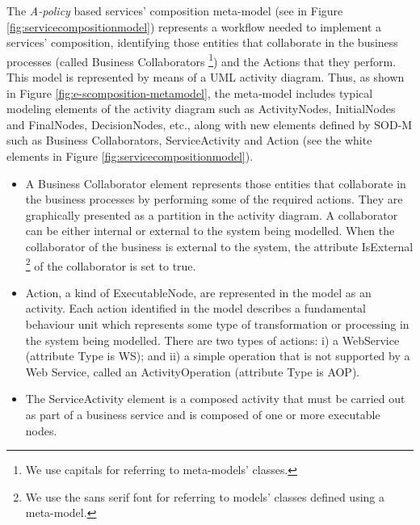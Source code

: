 
The {\em A-policy} based services' composition meta-model (see  in Figure \ref{fig:servicecompositionmodel})
represents  a workflow needed to implement a services' composition, identifying those entities that collaborate in the business processes (called {\sc Business Collaborators} \footnote{We use {\sc capitals} for referring to meta-models' classes.}) and the {\sc Actions} that  they perform. This model is represented by means of a UML activity diagram. Thus, as shown in Figure \ref{fig:e-scomposition-metamodel}, the meta-model includes typical modeling elements of the activity diagram such as {\sc ActivityNodes}, {\sc InitialNodes} and {\sc FinalNodes}, {\sc DecisionNodes}, etc., along with new elements defined by SOD-M such as {\sc Business Collaborators}, {\sc ServiceActivity} and {\sc Action} (see the white  elements   in Figure \ref{fig:servicecompositionmodel}).

\begin{itemize}
\item A {\sc Business Collaborator} element represents those entities that collaborate in the business processes by performing some of the required actions. They are graphically presented as a partition in the activity diagram. A collaborator can be either internal or external to the system being modelled. When the collaborator of the business is external to the system, the attribute {\sf\small IsExternal} \footnote{We use the {\sf sans serif} font for referring to models' classes defined using a meta-model.} of the collaborator is set to true.

\item {\sc Action}, a kind of {\sc ExecutableNode}, are represented in the model as an activity. Each action identified in the model describes a fundamental behaviour unit which represents some type of transformation or processing in the system being modelled. There are two types of actions: i) a WebService (attribute Type is {\sf\small WS}); and ii) a simple operation that is not supported by a Web Service, called an {\sc ActivityOperation} (attribute Type is {\sc AOP}).
    
\item The {\sc ServiceActivity} element is a composed activity that  must be carried out as part of a business service and is composed of one or more executable nodes.
\end{itemize}

